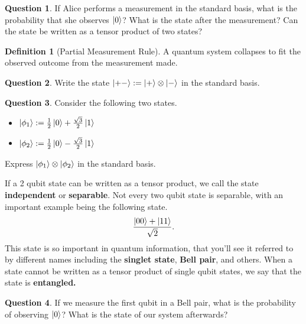 \documentclass[letterpaper, 12pt]{article}
\newcommand{\1}{\mathds{1}}	%
\theoremstyle{definition}
\newtheorem{definition}[theorem]{Definition}
\newtheorem{question}{Question}
\begin{document}
\begin{question}
If Alice performs a measurement in the standard basis, what is the probability that she observes $\ket{0}$? What is the state after the measurement? Can the state be written as a tensor product of two states?
\end{question}

\begin{definition}[Partial Measurement Rule]
    A quantum system collapses to fit the observed outcome from the measurement made.
\end{definition}

\begin{question}
    Write the state $\ket{+-} := \ket{+}\otimes \ket{-}$ in the standard basis. 
\end{question}
\vspace{20mm}

\begin{question}
    Consider the following two states.
    \begin{itemize}
        \item $\ket{\phi_1} := \frac{1}{2} \ket{0} + \frac{\sqrt{3}}{2}\ket{1}$
        \item $\ket{\phi_2} := \frac{1}{2} \ket{0} - \frac{\sqrt{3}}{2}\ket{1}$        
    \end{itemize}
    Express $\ket{\phi_1} \otimes \ket{\phi_2}$ in the standard basis. 
\end{question}
\vspace{10mm}

If a 2 qubit state can be written as a tensor product, we call the state \textbf{independent} or \textbf{separable}. Not every two qubit state is separable, with an important example being the following state.
\begin{equation}
    \frac{\ket{00} + \ket{11}}{\sqrt{2}}.
\end{equation}
This state is so important in quantum information, that you'll see it referred to by different names including the \textbf{singlet state}, \textbf{Bell pair}, and others. When a state cannot be written as a tensor product of single qubit states, we say that the state is \textbf{entangled.}

\begin{question}
    If we measure the first qubit in a Bell pair, what is the probability of observing $\ket{0}$? What is the state of our system afterwards? 
\end{question}
\vspace{20mm}
\end{document}
